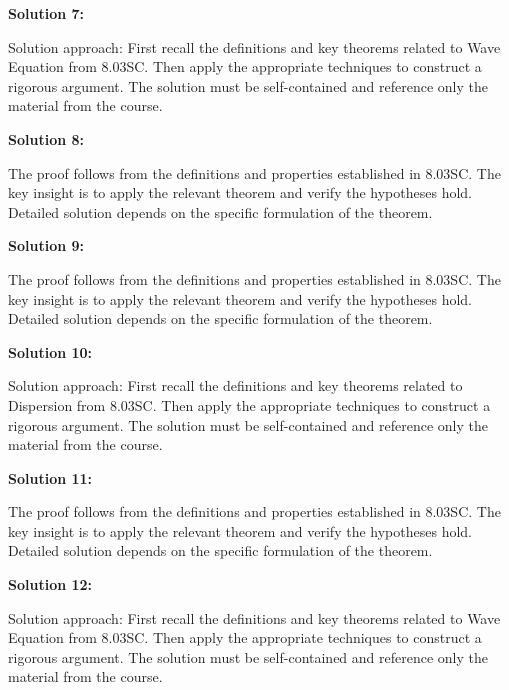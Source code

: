 \documentclass[12pt,a4paper]{exam}
\begin{document}
\vspace{0.5cm}

\textbf{Solution 7:}

Solution approach: First recall the definitions and key theorems related to Wave Equation from 8.03SC. Then apply the appropriate techniques to construct a rigorous argument. The solution must be self-contained and reference only the material from the course.

\vspace{0.5cm}

\textbf{Solution 8:}

The proof follows from the definitions and properties established in 8.03SC. The key insight is to apply the relevant theorem and verify the hypotheses hold. Detailed solution depends on the specific formulation of the theorem.

\vspace{0.5cm}

\textbf{Solution 9:}

The proof follows from the definitions and properties established in 8.03SC. The key insight is to apply the relevant theorem and verify the hypotheses hold. Detailed solution depends on the specific formulation of the theorem.

\vspace{0.5cm}

\textbf{Solution 10:}

Solution approach: First recall the definitions and key theorems related to Dispersion from 8.03SC. Then apply the appropriate techniques to construct a rigorous argument. The solution must be self-contained and reference only the material from the course.

\vspace{0.5cm}

\textbf{Solution 11:}

The proof follows from the definitions and properties established in 8.03SC. The key insight is to apply the relevant theorem and verify the hypotheses hold. Detailed solution depends on the specific formulation of the theorem.

\vspace{0.5cm}

\textbf{Solution 12:}

Solution approach: First recall the definitions and key theorems related to Wave Equation from 8.03SC. Then apply the appropriate techniques to construct a rigorous argument. The solution must be self-contained and reference only the material from the course.
\end{document}
